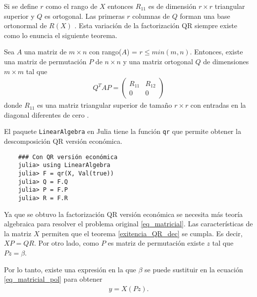 Si se define $r$ como el rango de $X$ entonces $R_{11}$ es de dimensión $r \times r$ triangular superior y $Q$ es ortogonal. Las primeras $r$ columnas de $Q$ forman una base ortonormal de $R(X)$ \cite{numerical_linear_algebra}. Esta variación de la factorización QR siempre existe como lo enuncia el siguiente teorema.

\begin{theorem} \label{exitencia_QR_dec}
Sea $A$ una matriz de $m \times n$ con rango($A$) = $r \leq min (m, n)$. Entonces, existe una matriz de permutación $P$ de $n \times n$ y una matriz ortogonal $Q$ de dimensiones $m \times m$ tal que 
\begin{equation*}
\begin{aligned}
Q^{T}AP = 
\begin{pmatrix}
R_{11} & R_{12} \\
   0      & 0
\end{pmatrix}
\end{aligned}
\end{equation*}
donde $R_{11}$ es una matriz triangular superior de tamaño $r \times r$ con entradas en la diagonal diferentes de cero \cite[p.~532]{numerical_linear_algebra}.
\end{theorem}

El paquete \texttt{LinearAlgebra} en \textsf{Julia} tiene la función \texttt{qr} que permite obtener la descomposición QR versión económica.  

\begin{verbatim}
    ### Con QR versión económica
    julia> using LinearAlgebra
    julia> F = qr(X, Val(true))
    julia> Q = F.Q
    julia> P = F.P
    julia> R = F.R
\end{verbatim}

Ya que se obtuvo la factorización QR versión económica se necesita más teoría algebraica para resolver el problema original \ref{eq_matricial}. Las características de la matriz $X$ permiten que el teorema \ref{exitencia_QR_dec} se cumpla. Es decir, $XP = QR$. Por otro lado, como $P$ es matriz de permutación existe $z$ tal que $Pz = \beta$. 

Por lo tanto, existe una expresión en la que $\beta$ se puede sustituir en la ecuación \ref{eq_matricial_pol} para obtener 
\begin{equation*}
    \begin{aligned}
    y = X (Pz) . 
    \end{aligned}
\end{equation*}

